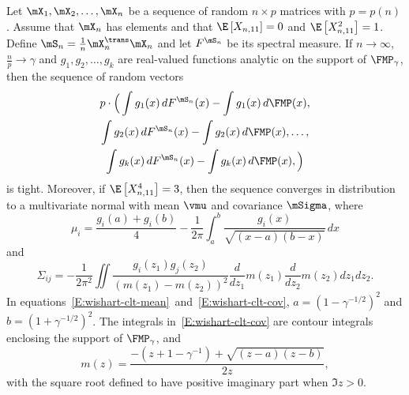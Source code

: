 \begin{theorem}\label{T:wishart-clt}
    Let $\mX_1, \mX_2, \ldots, \mX_n$ be a sequence of random $n\times p$ 
    matrices with $p = p(n)$.  Assume that $\mX_n$ has \iid elements and that 
    $\E\left[ X_{n,11} \right] = 0$ and $\E\left[ X_{n,11}^2 \right] = 1$.  
    Define $\mS_n = \frac{1}{n} \mX_n^\trans \mX_n$ and let $F^{\mS_n}$ be its 
    spectral measure.  If $n \to \infty$, $\frac{n}{p} \to \gamma$ and $g_1, 
    g_2, \ldots, g_k$ 
    are real-valued functions analytic on the support of $\FMP_\gamma$, then 
    the sequence of random vectors
    \begin{multline*}
        p
        \cdot
        \Big(
	    \int g_1(x) \, dF^{\mS_n}(x)
	    -
            \int g_1(x) \, d\FMP(x), \\
	    \int g_2(x) \, dF^{\mS_n}(x)
	    -
	    \int g_2(x) \, d\FMP(x),
	    \ldots, \\
            \int g_k(x) \, dF^{\mS_n}(x)
	    -
            \int g_k(x) \, d\FMP(x),
	\Big)
    \end{multline*}
    is tight.
    Moreover, if $\E \left[ X_{n,11}^4 \right] = 3$, then the sequence 
    converges in distribution to a multivariate normal with mean $\vmu$ and 
    covariance $\mSigma$, where 
    \begin{equation}\label{E:wishart-clt-mean}
        \mu_i
	    =
	    \frac{ g_i(a) + g_i(b) }
                 { 4 }
	    -
            \frac{1}{2 \pi}
	    \int_{a}^{b}
	        \frac{ g_i(x) }
	             { \sqrt{(x-a)(b-x)} }
                \,
                dx
    \end{equation}
    and
    \begin{equation}\label{E:wishart-clt-cov}
    	\Sigma_{ij}
    	=
    	-
    	\frac{1}{2 \pi^2}
    	\iint
    	    \frac{g_i(z_1) g_j(z_2)}
    	         {\left( m(z_1) - m(z_2) \right)^2}
    	    \frac{d}{dz_1} m(z_1)
    	    \frac{d}{dz_2} m(z_2)
    	    dz_1 dz_2.
    \end{equation}
    In equations~\eqref{E:wishart-clt-mean}~and~\eqref{E:wishart-clt-cov},
    $a = (1 - \gamma^{-1/2})^2$ and $b = (1 + \gamma^{-1/2})^2$.  The 
    integrals in~\eqref{E:wishart-clt-cov} are contour integrals enclosing the 
    support of $\FMP_\gamma$, and
    \begin{equation}
        m(z)
        =
	    \frac{-(z + 1 - \gamma^{-1}) + \sqrt{(z-a)(z-b)}}{2 z},
    \end{equation}
    with the square root defined to have positive imaginary part when
    $\Im z > 0$.
\end{theorem}

